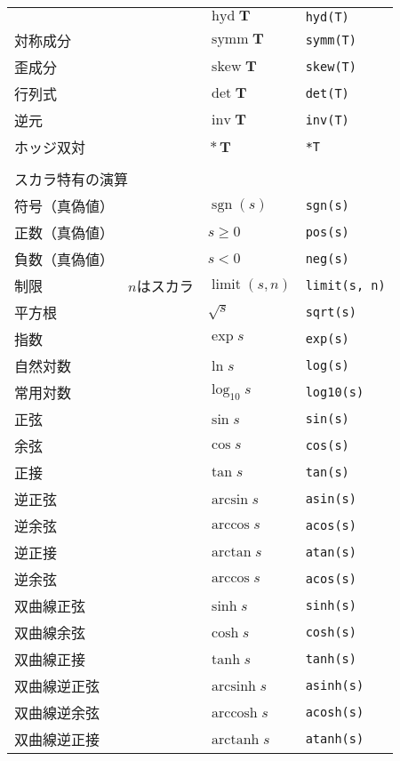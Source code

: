 \begin{longtable}{Xlll}
 &  & $\mathop{\mathrm{hyd}}\bm{T}$ & \verb|hyd(T)| \\
 対称成分 &  & $\mathop{\mathrm{symm}}\bm{T}$ & \verb|symm(T)| \\
 歪成分 &  & $\mathop{\mathrm{skew}}\bm{T}$ & \verb|skew(T)| \\
 行列式 &  & $\det\bm{T}$ & \verb|det(T)| \\
 逆元 &  & $\mathop{\mathrm{inv}}\bm{T}$ & \verb|inv(T)| \\
 ホッジ双対 &  & $\mathop{*}\bm{T}$ & \verb|*T| \\
 \\
 \multicolumn{4}{l}{\sffamily\gtfamily スカラ特有の演算} \\
 \hline
 符号（真偽値） &  & $\mathop{\mathrm{sgn}}(s)$ & \verb|sgn(s)| \\
 正数（真偽値） &  & $s \ge 0$ & \verb|pos(s)| \\
 負数（真偽値） &  & $s < 0$ & \verb|neg(s)| \\
 制限 & $n$はスカラ & $\mathop{\mathrm{limit}}(s, n)$ & \verb|limit(s, n)| \\
 平方根 &  & $\sqrt{s}$ & \verb|sqrt(s)| \\
 指数 &  & $\exp s$ & \verb|exp(s)| \\
 自然対数 &  & $\ln s$ & \verb|log(s)| \\
 常用対数 &  & $\log_{10}s$ & \verb|log10(s)| \\
 正弦 &  & $\sin s$ & \verb|sin(s)| \\
 余弦 &  & $\cos s$ & \verb|cos(s)| \\
 正接 &  & $\tan s$ & \verb|tan(s)| \\
 逆正弦 &  & $\arcsin s$ & \verb|asin(s)| \\
 逆余弦 &  & $\arccos s$ & \verb|acos(s)| \\
 逆正接 &  & $\arctan s$ & \verb|atan(s)| \\
 逆余弦 &  & $\arccos s$ & \verb|acos(s)| \\
 双曲線正弦 &  & $\sinh s$ & \verb|sinh(s)| \\
 双曲線余弦 &  & $\cosh s$ & \verb|cosh(s)| \\
 双曲線正接 &  & $\tanh s$ & \verb|tanh(s)| \\
 双曲線逆正弦 &  & $\mathop{\mathrm{arcsinh}} s$ & \verb|asinh(s)| \\
 双曲線逆余弦 &  & $\mathop{\mathrm{arccosh}} s$ & \verb|acosh(s)| \\
 双曲線逆正接 &  & $\mathop{\mathrm{arctanh}} s$ & \verb|atanh(s)| \\

\end{longtable}
